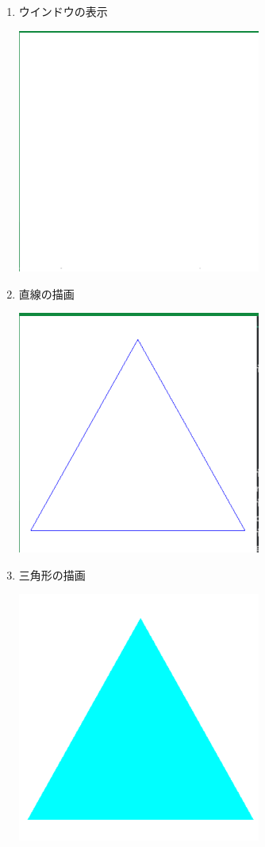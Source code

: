 \documentclass{scrartcl}
\begin{document}
\begin{enumerate}
\item ウインドウの表示\\

\begin{center}
\includegraphics[width=8cm]{./2017-10-03-11.png}
\end{center}

\item 直線の描画\\

\begin{center}
\includegraphics[width=8cm]{./2017-10-03-01.png}
\end{center}

\item 三角形の描画\\

\begin{center}
\includegraphics[width=8cm]{./2017-10-03-02.png}
\end{center}


\end{enumerate}
\end{document}
